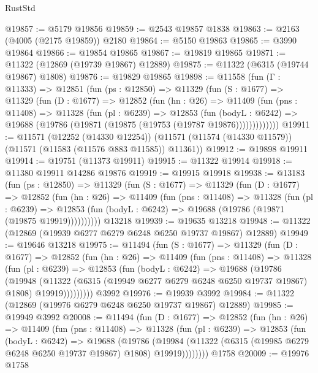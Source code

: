 \begin{lexlean}{RustStd}
\begin{coremodule}
@19857 := @5179 @19856
@19859 := @2543 @19857 @1838
@19863 := @2163 (@4005 (@2175 @19859)) @2180
@19864 := @5150 @19863
@19865 := @3990 @19864
@19866 := @19854 @19865
@19867 := @19819 @19865
@19871 := @11322 (@12869 (@19739 @19867) @12889)
@19875 := @11322 (@6315 (@19744 @19867) @1808)
@19876 := @19829 @19865
@19898 := @11558
    (fun (Γ : @11333) =>
    @12851
      (fun (ps : @12850) =>
      @11329
        (fun (S : @1677) =>
        @11329
          (fun (D : @1677) =>
          @12852
            (fun (hn : @26) =>
            @11409
              (fun (pns : @11408) =>
              @11328
                (fun (pl : @6239) =>
                @12853
                  (fun (bodyL : @6242) =>
                  @19688 (@19786 (@19871 (@19875 (@19753 (@19787 @19876)))))))))))))
@19911 := @11571
    (@12252 (@14330 @12254))
    (@11571 (@11574 (@14330 @11579)) (@11571 (@11583 (@11576 @883 @11585)) @11361))
@19912 := @19898 @19911
@19914 := @19751 (@11373 @19911)
@19915 := @11322 @19914
@19918 := @11380 @19911 @14286 @19876
@19919 := @19915 @19918
@19938 := @13183
    (fun (ps : @12850) =>
    @11329
      (fun (S : @1677) =>
      @11329
        (fun (D : @1677) =>
        @12852
          (fun (hn : @26) =>
          @11409
            (fun (pns : @11408) =>
            @11328
              (fun (pl : @6239) =>
              @12853 (fun (bodyL : @6242) => @19688 (@19786 (@19871 (@19875 @19919))))))))))
    @13218
@19939 := @19635 @13218
@19948 := @11322 (@12869 (@19939 @6277 @6279 @6248 @6250 @19737 @19867) @12889)
@19949 := @19646 @13218
@19975 := @11494
    (fun (S : @1677) =>
    @11329
      (fun (D : @1677) =>
      @12852
        (fun (hn : @26) =>
        @11409
          (fun (pns : @11408) =>
          @11328
            (fun (pl : @6239) =>
            @12853
              (fun (bodyL : @6242) =>
              @19688
                (@19786
                  (@19948
                    (@11322
                      (@6315 (@19949 @6277 @6279 @6248 @6250 @19737 @19867) @1808)
                      @19919)))))))))
    @3992
@19976 := @19939 @3992
@19984 := @11322 (@12869 (@19976 @6279 @6248 @6250 @19737 @19867) @12889)
@19985 := @19949 @3992
@20008 := @11494
    (fun (D : @1677) =>
    @12852
      (fun (hn : @26) =>
      @11409
        (fun (pns : @11408) =>
        @11328
          (fun (pl : @6239) =>
          @12853
            (fun (bodyL : @6242) =>
            @19688
              (@19786
                (@19984
                  (@11322 (@6315 (@19985 @6279 @6248 @6250 @19737 @19867) @1808) @19919))))))))
    @1758
@20009 := @19976 @1758

\end{coremodule}
\end{lexlean}
